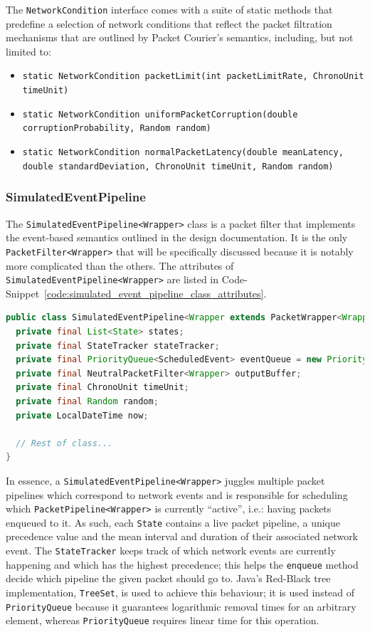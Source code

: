 The \texttt{NetworkCondition} interface comes with a suite of static methods that predefine a selection of network
conditions that reflect the packet filtration mechanisms that are outlined by Packet Courier's semantics, including,
but not limited to:
\begin{itemize}
    \item \texttt{static NetworkCondition packetLimit(int packetLimitRate, ChronoUnit timeUnit)}
    \item \texttt{static NetworkCondition uniformPacketCorruption(double corruptionProbability, Random random)}
    \item \texttt{static NetworkCondition normalPacketLatency(double meanLatency, double standardDeviation,
        ChronoUnit timeUnit, Random random)}
\end{itemize}

\subsubsection{SimulatedEventPipeline}

The \texttt{SimulatedEventPipeline<Wrapper>} class is a packet filter that implements the event-based semantics
outlined in the design documentation. It is the only \texttt{PacketFilter<Wrapper>} that will be specifically
discussed because it is notably more complicated than the others. The attributes of
\texttt{SimulatedEventPipeline<Wrapper>} are listed in
Code-Snippet~\ref{code:simulated_event_pipeline_class_attributes}.
\begin{lstlisting}[language=Java,caption={The attributes of the \texttt{SimulatedEventPipeline<Wrapper>} class.},
    label={code:simulated_event_pipeline_class_attributes},captionpos=b]
public class SimulatedEventPipeline<Wrapper extends PacketWrapper<Wrapper>> implements PacketFilter<Wrapper> {
  private final List<State> states;
  private final StateTracker stateTracker;
  private final PriorityQueue<ScheduledEvent> eventQueue = new PriorityQueue<>();
  private final NeutralPacketFilter<Wrapper> outputBuffer;
  private final ChronoUnit timeUnit;
  private final Random random;
  private LocalDateTime now;

  // Rest of class...
}
\end{lstlisting}

In essence, a \texttt{SimulatedEventPipeline<Wrapper>} juggles multiple packet pipelines which correspond to network
events and is responsible for scheduling which \texttt{PacketPipeline<Wrapper>} is currently ``active'', i.e.:
having packets enqueued to it. As such, each \texttt{State} contains a live packet pipeline, a unique precedence
value and the mean interval and duration of their associated network event. The \texttt{StateTracker} keeps
track of which network events are currently happening and which has the highest precedence; this helps the
\texttt{enqueue} method decide which pipeline the given packet should go to. Java's Red-Black tree implementation,
\texttt{TreeSet}\cite{java_TreeSet, baeldung_java_TreeSet}, is used to achieve this behaviour; it is used instead of
\texttt{PriorityQueue} because it guarantees logarithmic removal times for an arbitrary element, whereas
\texttt{PriorityQueue} requires linear time for this operation\cite{java_PriorityQueue}.


